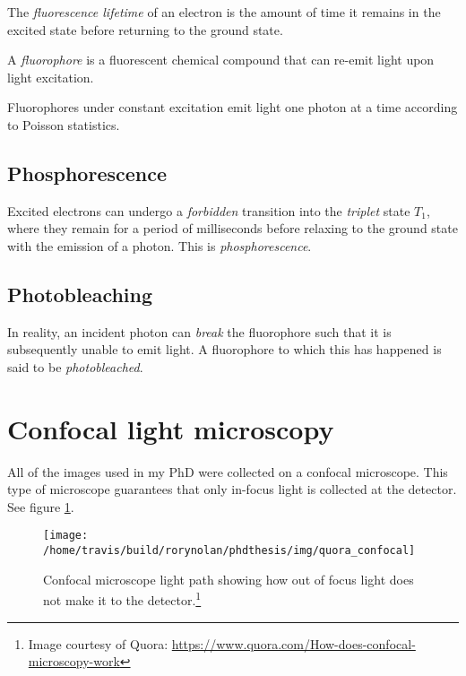\documentclass[12pt,]{book}
\let\rmarkdownfootnote\footnote%
\def\footnote{\protect\rmarkdownfootnote}
\theoremstyle{definition}
\theoremstyle{definition}
\theoremstyle{definition}
\theoremstyle{remark}
\let\BeginKnitrBlock\begin \let\EndKnitrBlock\end
\begin{document}
\BeginKnitrBlock{definition}
\protect\hypertarget{def:unnamed-chunk-2}{}{\label{def:unnamed-chunk-2} }The
\emph{fluorescence lifetime} of an electron is the amount of time it
remains in the excited state before returning to the ground state.
\EndKnitrBlock{definition}

\BeginKnitrBlock{definition}
\protect\hypertarget{def:unnamed-chunk-3}{}{\label{def:unnamed-chunk-3} }A
\emph{fluorophore} is a fluorescent chemical compound that can re-emit
light upon light excitation.
\EndKnitrBlock{definition}

Fluorophores under constant excitation emit light one photon at a time
according to Poisson statistics.

\subsection{Phosphorescence}\label{phosphorescence}

\BeginKnitrBlock{definition}
\protect\hypertarget{def:unnamed-chunk-4}{}{\label{def:unnamed-chunk-4}
}Excited electrons can undergo a \emph{forbidden} transition into the
\emph{triplet} state \(T_1\), where they remain for a period of
milliseconds before relaxing to the ground state with the emission of a
photon. This is \emph{phosphorescence}.
\EndKnitrBlock{definition}

\subsection{Photobleaching}\label{photobleaching}

In reality, an incident photon can \emph{break} the fluorophore such
that it is subsequently unable to emit light. A fluorophore to which
this has happened is said to be \emph{photobleached}.

\section{Confocal light microscopy}\label{confocal-light-microscopy}

All of the images used in my PhD were collected on a confocal
microscope. This type of microscope guarantees that only in-focus light
is collected at the detector. See figure \ref{fig:confocal}.





\begin{figure}

\texttt{[image: /home/travis/build/rorynolan/phdthesis/img/quora\_confocal]} \hfill{}

\caption{Confocal microscope light path showing how out of
focus light does not make it to the detector.\footnote{Image courtesy of
  Quora: \url{https://www.quora.com/How-does-confocal-microscopy-work}}}\label{fig:confocal}
\end{figure}
\end{document}
